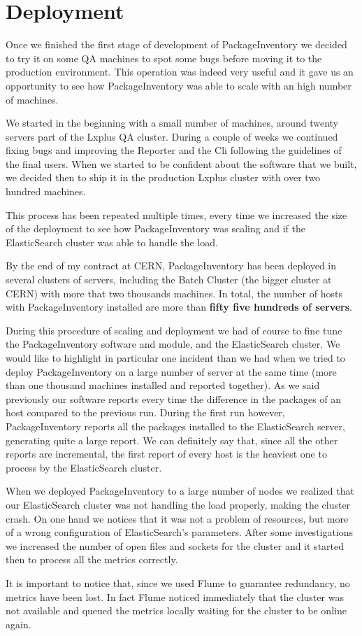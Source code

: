 \section{Deployment}

Once we finished the first stage of development of PackageInventory we
decided to try it on some QA machines to spot some bugs before moving it
to the production environment. This operation was indeed very useful and
it gave us an opportunity to see how PackageInventory was able to scale
with an high number of machines.

We started in the beginning with a small number of machines, around twenty
servers part of the Lxplus QA cluster. During a couple of weeks we
continued fixing bugs and improving the Reporter and the Cli following the
guidelines of the final users. When we started to be confident about the
software that we built, we decided then to ship it in the production
Lxplus cluster with over two hundred machines.

This process has been repeated multiple times, every time we increased the
size of the deployment to see how PackageInventory was scaling and if the
ElasticSearch cluster was able to handle the load.

By the end of my contract at CERN, PackageInventory has been deployed in
several clusters of servers, including the Batch Cluster (the bigger
cluster at CERN) with more that two thousands machines. In total, the
number of hosts with PackageInventory installed are more than
\textbf{fifty five hundreds of servers}.

During this procedure of scaling and deployment we had of course to fine
tune the PackageInventory software and module, and the ElasticSearch
cluster. We would like to highlight in particular one incident than we had
when we tried to deploy PackageInventory on a large number of server at
the same time (more than one thousand machines installed and reported
together). As we said previously our software reports every time the
difference in the packages of an host compared to the previous run. During
the first run however, PackageInventory reports all the packages installed
to the ElasticSearch server, generating quite a large report. We can
definitely say that, since all the other reports are incremental, the
first report of every host is the heaviest one to process by the
ElasticSearch cluster.

When we deployed PackageInventory to a large number of nodes we realized
that our ElasticSearch cluster was not handling the load properly, making
the cluster crash. On one hand we notices that it was not a problem of
resources, but more of a wrong configuration of ElasticSearch's
parameters. After some investigations we increased the number of open
files and sockets for the cluster and it started then to process all the
metrics correctly.

It is important to notice that, since we used Flume to guarantee
redundancy, no metrics have been lost. In fact Flume noticed immediately
that the cluster was not available and queued the metrics locally waiting
for the cluster to be online again.

